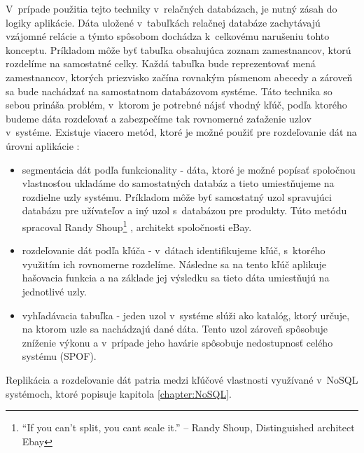 \documentclass[11pt,twoside,a4paper]{book}
\begin{document}
V~prípade použitia tejto techniky v~relačných databázach, je nutný zásah do logiky aplikácie. Dáta uložené v~tabuľkách relačnej databáze zachytávajú vzájomné relácie a týmto spôsobom dochádza k~celkovému narušeniu tohto konceptu. Príkladom môže byť tabuľka obsahujúca zoznam zamestnancov, ktorú rozdelíme na samostatné celky. Každá tabuľka bude reprezentovať mená zamestnancov, ktorých priezvisko začína rovnakým písmenom abecedy a zároveň sa bude nachádzať na samostatnom databázovom systéme. Táto technika so sebou prináša problém, v~ktorom je potrebné nájsť vhodný kľúč, podľa ktorého budeme dáta rozdeľovať a zabezpečíme tak rovnomerné zaťaženie uzlov v~systéme. Existuje viacero metód, ktoré je možné použiť pre rozdeľovanie dát na úrovni aplikácie \cite{hewitt2010cassandra}:
\begin{itemize}
 \item 
      segmentácia dát podľa funkcionality - dáta, ktoré je možné popísať spoločnou vlastnosťou ukladáme do samostatných databáz a tieto umiestňujeme na rozdielne uzly systému. Príkladom môže byť samostatný uzol spravujúci databázu pre užívateľov a iný uzol s~databázou pre produkty. Túto metódu spracoval Randy Shoup\footnote{“If you can’t split, you cant scale it.” -- Randy Shoup, Distinguished architect Ebay} \cite{ebayShard}, architekt spoločnosti eBay.
  \item
      rozdeľovanie dát podľa kľúča - v~dátach identifikujeme kľúč, s~ktorého využitím ich rovnomerne rozdelíme. Následne sa na tento kľúč aplikuje hašovacia funkcia a na základe jej výsledku sa tieto dáta umiestňujú na jednotlivé uzly.
  \item
      vyhľadávacia tabuľka - jeden uzol v~systéme slúži ako katalóg, ktorý určuje, na ktorom uzle sa nachádzajú dané dáta. Tento uzol zároveň spôsobuje zníženie výkonu a v~prípade jeho havárie spôsobuje nedostupnosť celého systému (SPOF).
\end{itemize}

Replikácia a rozdeľovanie dát patria medzi kľúčové vlastnosti využívané v~NoSQL systémoch, ktoré popisuje kapitola \ref{chapter:NoSQL}.


\end{document}
